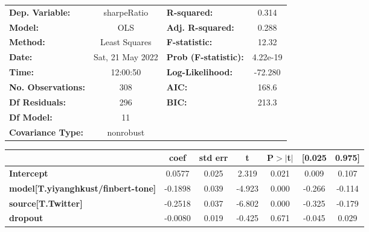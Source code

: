 \begin{center}
\begin{tabular}{lclc}
\toprule
\textbf{Dep. Variable:}                    &   sharpeRatio    & \textbf{  R-squared:         } &     0.314   \\
\textbf{Model:}                            &       OLS        & \textbf{  Adj. R-squared:    } &     0.288   \\
\textbf{Method:}                           &  Least Squares   & \textbf{  F-statistic:       } &     12.32   \\
\textbf{Date:}                             & Sat, 21 May 2022 & \textbf{  Prob (F-statistic):} &  4.22e-19   \\
\textbf{Time:}                             &     12:00:50     & \textbf{  Log-Likelihood:    } &   -72.280   \\
\textbf{No. Observations:}                 &         308      & \textbf{  AIC:               } &     168.6   \\
\textbf{Df Residuals:}                     &         296      & \textbf{  BIC:               } &     213.3   \\
\textbf{Df Model:}                         &          11      & \textbf{                     } &             \\
\textbf{Covariance Type:}                  &    nonrobust     & \textbf{                     } &             \\
\bottomrule
\end{tabular}
\begin{tabular}{lcccccc}
                                           & \textbf{coef} & \textbf{std err} & \textbf{t} & \textbf{P$> |$t$|$} & \textbf{[0.025} & \textbf{0.975]}  \\
\midrule
\textbf{Intercept}                         &       0.0577  &        0.025     &     2.319  &         0.021        &        0.009    &        0.107     \\
\textbf{model[T.yiyanghkust/finbert-tone]} &      -0.1898  &        0.039     &    -4.923  &         0.000        &       -0.266    &       -0.114     \\
\textbf{source[T.Twitter]}                 &      -0.2518  &        0.037     &    -6.802  &         0.000        &       -0.325    &       -0.179     \\
\textbf{dropout}                           &      -0.0080  &        0.019     &    -0.425  &         0.671        &       -0.045    &        0.029     \\

\end{tabular}
\end{center}
